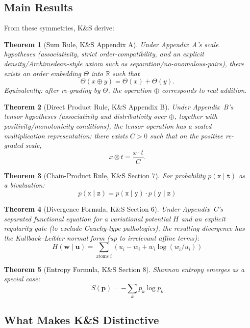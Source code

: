\documentclass[11pt]{article}
\newtheorem{theorem}{Theorem}[section]
\begin{document}
\subsection{Main Results}

From these symmetries, K\&S derive:

\begin{theorem}[Sum Rule, K\&S Appendix A]
Under Appendix~A's scale hypotheses (associativity, strict order-compatibility, and an explicit
density/Archimedean-style axiom such as separation/no-anomalous-pairs), there exists an
order embedding $\Theta$ into $\mathbb{R}$ such that
\[
\Theta(x \oplus y) = \Theta(x) + \Theta(y).
\]
Equivalently: after re-grading by $\Theta$, the operation $\oplus$ corresponds to real addition.
\end{theorem}

\begin{theorem}[Direct Product Rule, K\&S Appendix B]
Under Appendix~B's tensor hypotheses (associativity and distributivity over $\oplus$, together with
positivity/monotonicity conditions), the tensor operation has a scaled multiplication representation:
there exists $C>0$ such that on the positive re-graded scale,
\[
x \otimes t = \frac{x \cdot t}{C}.
\]
\end{theorem}

\begin{theorem}[Chain-Product Rule, K\&S Section 7]
For probability $p(\mathtt{x} \mid \mathtt{t})$ as a bivaluation:
\[
p(\mathtt{x} \mid \mathtt{z}) = p(\mathtt{x} \mid \mathtt{y}) \cdot p(\mathtt{y} \mid \mathtt{z})
\]
\end{theorem}

\begin{theorem}[Divergence Formula, K\&S Section 6]
Under Appendix~C's separated functional equation for a variational potential $H$ and an explicit
regularity gate (to exclude Cauchy-type pathologies), the resulting divergence has the
Kullback--Leibler normal form (up to irrelevant affine terms):
\[
H(\mathbf{w} \mid \mathbf{u}) = \sum_{\text{atoms } i} \left( u_i - w_i + w_i \log(w_i / u_i) \right)
\]
\end{theorem}

\begin{theorem}[Entropy Formula, K\&S Section 8]
Shannon entropy emerges as a special case:
\[
S(\mathbf{p}) = -\sum_k p_k \log p_k
\]
\end{theorem}

\subsection{What Makes K\&S Distinctive}
\end{document}
